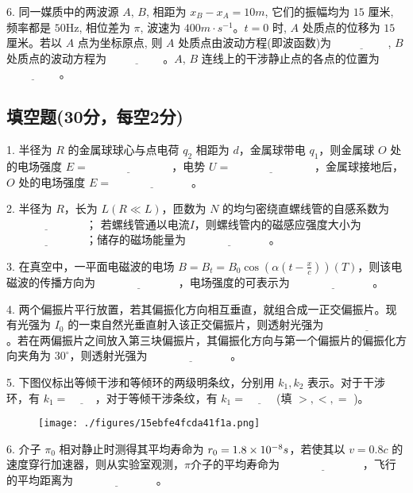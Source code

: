 6. 同一媒质中的两波源 $A$, $B$, 相距为 $x_B - x_A = 10m$, 它们的振幅均为 $15$ 厘米, 频率都是 $50$Hz, 相位差为 $\pi$, 波速为 $400m\cdot s^{-1}$。$t = 0$ 时, $A$ 处质点的位移为 $15$ 厘米。若以 $A$ 点为坐标原点, 则 $A$ 处质点由波动方程(即波函数)为 $\underline{\hspace{2cm}}$, $B$ 处质点的波动方程为 $\underline{\hspace{2cm}}$。$A$, $B$ 连线上的干涉静止点的各点的位置为 $\underline{\hspace{2cm}}$。
\subsection{填空题(30分，每空2分)}
1. 半径为 $R$ 的金属球球心与点电荷 $q_2$ 相距为 $d$，金属球带电 $q_1$，则金属球 $O$ 处的电场强度 $E= \underline{\hspace{3cm}}$ ，电势 $U= \underline{\hspace{3cm}}$ ，金属球接地后，$O$ 处的电场强度 $E= \underline{\hspace{3cm}}$。

  2. 半径为 $R$，长为 $L (R \ll L)$，匝数为 $N$ 的均匀密绕直螺线管的自感系数为 $\underline{\hspace{3cm}}$； 若螺线管通以电流$I$，则螺线管内的磁感应强度大小为 $\underline{\hspace{3cm}}$；储存的磁场能量为 $\underline{\hspace{3cm}}$。

  3. 在真空中，一平面电磁波的电场 $B=B_t=B_0 \cos(\alpha (t - \frac{x}{c})) (T)$，则该电磁波的传播方向为 $\underline{\hspace{3cm}}$，电场强度的可表示为 $\underline{\hspace{3cm}}$。

  4. 两个偏振片平行放置，若其偏振化方向相互垂直，就组合成一正交偏振片。现有光强为 $I_0$ 的一束自然光垂直射入该正交偏振片，则透射光强为 $\underline{\hspace{3cm}}$。若在两偏振片之间放入第三块偏振片，其偏振化方向与第一个偏振片的偏振化方向夹角为 $30^\circ$，则透射光强为 $\underline{\hspace{3cm}}$。

  5. 下图仪标出等倾干涉和等倾环的两级明条纹，分别用 $k_1, k_2$ 表示。对于干涉环，有 $k_1 = \underline{\hspace{1cm}}$，对于等倾干涉条纹，有 $k_1 = \underline{\hspace{1cm}}$ (填 $>, <, =$ )。
\begin{figure}[ht]
\centering
\texttt{[image: ./figures/15ebfe4fcda41f1a.png]}
\caption{} \label{fig_NJU07_3}
\end{figure}
6. 介子 $\pi_0$ 相对静止时测得其平均寿命为 $r_0=1.8 \times 10^{-8} \\ s$，若使其以 $v = 0.8c$ 的速度穿行加速器，则从实验室观测，$\pi$介子的平均寿命为 $\underline{\hspace{3cm}}$，飞行的平均距离为 $\underline{\hspace{3cm}}$。
